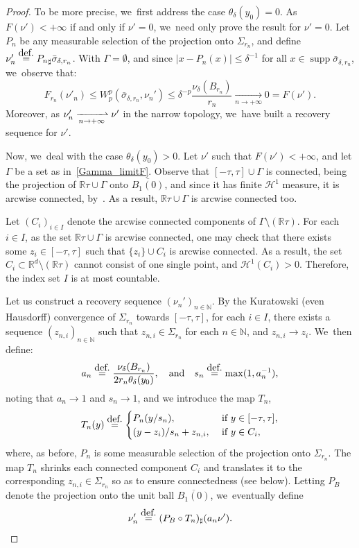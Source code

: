 \documentclass[11pt]{article}
\numberwithin{equation}{section}
\theoremstyle{definition}
\newcommand{\eqdef}{\ensuremath{\stackrel{\mbox{\upshape\tiny def.}}{=}}}
\newcommand\cH{\mathcal{H}}
\newcommand{\RR}{\mathbb{R}}
\DeclareMathOperator{\supp}{supp}
\newcommand{\abs}[1]{\left\lvert#1\right\rvert}
\begin{document}
\begin{proof}
To be more precise, we~first address the case $\theta_\delta(y_0)=0$. As $F(\nu')<+\infty$ if and only if $\nu'=0$, we~need only prove the result for $\nu'=0$. Let $P_n$ be any measurable selection of the projection onto ${\Sigma_{r_n}}$, and define $\nu_n'\eqdef {P_n}_{\sharp} \bar \sigma_{\delta, r_n}$. With $\Gamma=\emptyset$, and since $\abs{x-P_n(x)}\le \delta^{-1}$ for all $x\in \supp \bar \sigma_{\delta,r_n}$, we~observe that:
\[
F_{r_n}(\nu'_n)\le W_p^p(\bar \sigma_{\delta, r_n},\nu_n')\le \delta^{-p} \frac{\nu_\delta(B_{r_n})}{r_n} \xrightarrow[n\to +\infty]{} 0 = F(\nu').
\]
Moreover, as $\nu'_n \xrightharpoonup[n \to +\infty]{} \nu'$ in the narrow topology, we~have built a recovery sequence for $\nu'$.

Now, we~deal with the case $\theta_{\delta}(y_0)>0$. Let $\nu'$ such that $F(\nu') < +\infty$, and let $\Gamma$ be a set as in~\eqref{Gamma_limitF}. Observe that $[-\tau,\tau]\cup \Gamma$ is connected, being the projection of $\RR\tau\cup \Gamma$ onto $\overline{B_1(0)}$, and since it has finite $\cH^1$ measure, it is arcwise connected, by~\cite[Prop.\,30.1, Cor.\,30.2]{david2006singular}. As a result, $\RR\tau\cup\Gamma$ is arcwise connected too.

Let $(C_{i})_{i\in I}$ denote the arcwise connected components of $\Gamma\setminus (\RR\tau)$. For each $i \in I$, as the set $\RR\tau\cup \Gamma$ is arcwise connected, one may check that there exists some $z_i\in [-\tau,\tau]$ such that $\{z_{i}\}\cup C_{i}$ is arcwise connected. As a result, the set $C_{i} \subset \RR^{d}\setminus(\RR\tau)$ cannot consist of one single point, and $\cH^1(C_i)>0$. Therefore, the index set $I$ is at most countable.

Let us construct a recovery sequence $(\nu_n')_{n\in \mathbb{N}}$. By the Kuratowski (even Hausdorff) convergence of $\Sigma_{r_{n}}$
towards $[-\tau,\tau]$, for each $i\in I$, there exists a sequence $(z_{n,i})_{n\in \mathbb{N}}$ such that $z_{n,i}\in \Sigma_{r_{n}}$ for each $n\in \mathbb{N}$, and $z_{n,i}\to z_i$. We~then define:
\begin{equation*}
a_n\eqdef \frac{\nu_{\delta}(B_{r_n})}{2r_n\theta_{\delta}(y_0)},
\quad\mbox{and}\quad
s_n\eqdef \max(1,a_{n}^{-1}),
\end{equation*}
noting that $a_n\to 1$ and $s_n\to 1$, and we introduce the map $T_n$,
\[
T_n(y)
\eqdef
\begin{cases}
P_n(y/s_{n}),& \text{ if $y \in [-\tau, \tau]$,} \\
(y-z_{i})/s_n+z_{n,i},& \text{ if $y \in C_i$},
\end{cases}
\]
where, as before, $P_n$ is some measurable selection of the projection onto ${\Sigma_{r_n}}$. The map $T_n$ shrinks each connected component $C_i$ and translates it to the corresponding $z_{n,i} \in \Sigma_{r_n}$ so as to ensure connectedness (see below). Letting $P_B$ denote the projection onto the unit ball $\overline{B_1(0)}$, we~eventually define
\[
\nu_n'\eqdef (P_B\circ T_n)_{\sharp}(a_n\nu').
\]


\end{proof}
\end{document}
